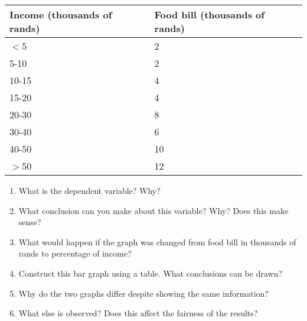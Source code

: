{\begin{center}
\begin{tabular}{|l|l|}
\hline
Income (thousands of rands) & Food bill (thousands of rands) \\ 
\hline
 $<$5  & 2  \\
 5-10  & 2  \\
 10-15 & 4  \\
 15-20 & 4  \\
 20-30 & 8  \\
 30-40 & 6  \\
 40-50 & 10 \\
 $>$50 & 12 \\
\hline
\end{tabular}
\end{center}

\begin{enumerate}
\item What is the dependent variable? Why?
\item What conclusion can you make about this variable? Why? Does this make sense? 
\item What would happen if the graph was changed from food bill in thousands of rands to percentage of income?
\item Construct this bar graph using a table. What conclusions can be drawn?
\item Why do the two graphs differ despite showing the same information?
\item What else is observed? Does this affect the fairness of the results? 
\end{enumerate}
}

